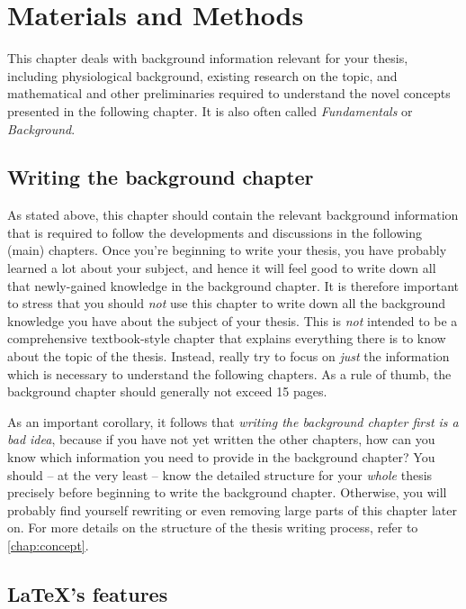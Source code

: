 \chapter{Materials and Methods}
\label{chap:materials-and-methods}

This chapter deals with background information relevant for your thesis, including physiological background, existing research on the topic, and mathematical and other preliminaries required to understand the novel concepts presented in the following chapter.
It is also often called \emph{Fundamentals} or \emph{Background}.

\section{Writing the background chapter}
As stated above, this chapter should contain the relevant background information that is required to follow the developments and discussions in the following (main) chapters.
Once you're beginning to write your thesis, you have probably learned a lot about your subject, and hence it will feel good to write down all that newly-gained knowledge in the background chapter.
It is therefore important to stress that you should \emph{not} use this chapter to write down all the background knowledge you have about the subject of your thesis.
This is \emph{not} intended to be a comprehensive textbook-style chapter that explains everything there is to know about the topic of the thesis.
Instead, really try to focus on \emph{just} the information which is necessary to understand the following chapters.
As a rule of thumb, the background chapter should generally not exceed 15 pages.

As an important corollary, it follows that \emph{writing the background chapter first is a bad idea}, because if you have not yet written the other chapters, how can you know which information you need to provide in the background chapter?
You should -- at the very least -- know the detailed structure for your \emph{whole} thesis precisely before beginning to write the background chapter.
Otherwise, you will probably find yourself rewriting or even removing large parts of this chapter later on.
For more details on the structure of the thesis writing process, refer to \cref{chap:concept}.

\section{\LaTeX's features}

